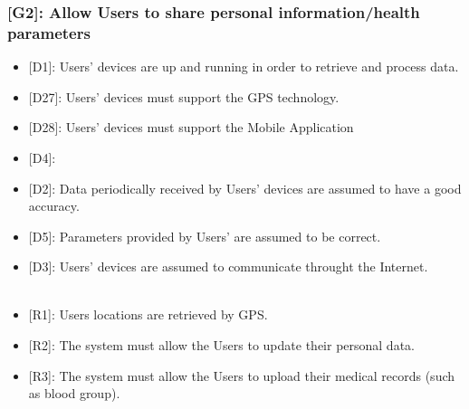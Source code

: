 \documentclass[12pt,a4paper]{article}
\begin{document}
	\subsubsection*{{[}{G2}{]}: Allow Users to share personal information/health parameters}
	\begin{itemize}
		\begin{itemize}
			\item {[D1]}: Users' devices are up and running in order to retrieve and process data.
			\item {[D27]}: Users' devices must support the GPS technology.
			\item {[D28]}: Users' devices must support the Mobile Application
			\item {[D4]}: 
			\item {[D2]}: Data periodically received by Users' devices are assumed to have a good accuracy. 
			\item {[D5]}: Parameters provided by Users' are assumed to be correct. 
			\item {[D3]}: Users' devices are assumed to communicate throught the Internet.
			\\\\
			\item {[R1]}: Users locations are retrieved by GPS.
			\item {[R2]}: The system must allow the Users to update their personal data.
			\item {[R3]}: The system must allow the Users to upload their medical records (such as blood group).
		\end{itemize} 
	\end{itemize}
\end{document}
